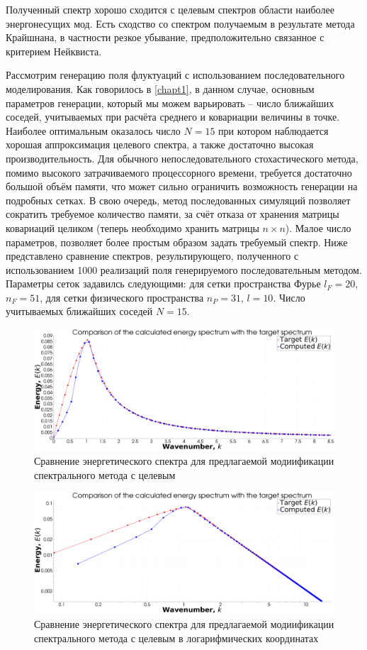 Полученный спектр хорошо сходится с целевым спектров области наиболее энергонесущих мод. Есть сходство со спектром получаемым в результате метода Крайшнана, в частности резкое убывание, предположительно связанное с критерием Нейквиста.

Рассмотрим генерацию поля флуктуаций с использованием последовательного моделирования. Как говорилось в \ref{chapt1}, в данном случае, основным параметров генерации, который мы можем варьировать -- число ближайших соседей, учитываемых при расчёта среднего и ковариации величины в точке. Наиболее оптимальным оказалось число $N=15$ при котором наблюдается хорошая аппроксимация целевого спектра, а также достаточно высокая производительность. Для обычного непоследовательного стохастического метода, помимо высокого затрачиваемого процессорного времени, требуется достаточно большой объём памяти, что может сильно ограничить возможность генерации на подробных сетках. В свою очередь, метод последованных симуляций позволяет сократить требуемое количество памяти, за счёт отказа от хранения матрицы ковариаций целиком (теперь необходимо хранить матрицы $n \times n$). Малое число параметров, позволяет более простым образом задать требуемый спектр. Ниже представлено сравнение спектров, результирующего, полученного с использованием 1000 реализаций поля генерируемого последовательным методом. Параметры сеток задавилсь следующими: для сетки пространства Фурье $l_F=20$, $n_F = 51$, для сетки физического пространства $n_{P} = 31$, $l=10$. Число учитываемых ближайших соседей $N = 15$.

\begin{figure}[ht] 
    \center
    \includegraphics [width=0.8\linewidth] {images/kriging/spectrum.png}
    \caption{Сравнение энергетического спектра для предлагаемой модиификации спектрального метода с целевым} 
    \label{img:kriging_result_field_no_angle}  
\end{figure}

\begin{figure}[ht] 
    \center
    \includegraphics [width=0.8\linewidth] {images/kriging/spectrum_loglog.png}
    \caption{Сравнение энергетического спектра для предлагаемой модиификации спектрального метода с целевым в логарифмических координатах} 
    \label{img:kriging_result_field_on_angle}  
\end{figure}

